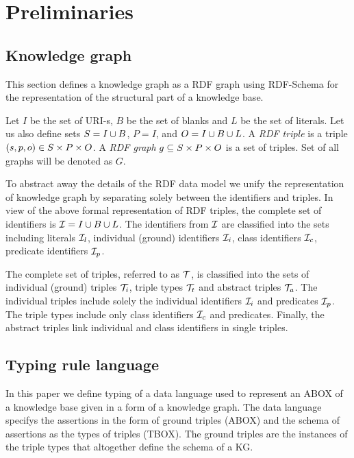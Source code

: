 \documentclass[runningheads]{llncs}
\newcommand{\I}{{\cal I}}
\newcommand{\T}{{\cal T}}
\begin{document}
\section{Preliminaries}


\subsection{Knowledge graph\label{sec:kg}}

This section defines a knowledge graph as a RDF graph \cite{rdf} using
RDF-Schema \cite{rdfschema} for the representation of the structural
part of a knowledge base. 

Let $I$ be the set of URI-s, $B$ be the set of blanks and $L$ be the
set of literals. Let us also define sets $S = I\cup\/B$, $P = I$, and
$O = I\cup\/B\cup\/L$. A \emph{RDF triple} is a triple
$(s,p,o)\in\/S\times\/P\times\/O$. A \emph{RDF graph}
$g\subseteq\/S\times\/P\times\/O$ is a set of triples. Set of all
graphs will be denoted as $G$.


To abstract away the details of the RDF data model we unify the
representation of knowledge graph by separating solely between the
identifiers and triples. In view of the above formal representation of
RDF triples, the complete set of identifiers is
$\I=I\cup\/B\cup\/L$. The identifiers from $\I$ are classified into
the sets including literals $\I_l$, individual (ground) identifiers
$\I_i$, class identifiers $\I_c$, predicate identifiers $\I_p$.

The complete set of triples, referred to as $\T$, is classified into
the sets of individual (ground) triples $\T_i$, triple types $\T_t$
and abstract triples $\T_a$. The individual triples include solely the
individual identifiers $\I_i$ and predicates $\I_p$. The triple types
include only class identifiers $\I_c$ and predicates. Finally, the
abstract triples link individual and class identifiers in single
triples.



\subsection{Typing rule language}

In this paper we define typing of a data language used to represent an
ABOX \cite{Brachman2004KnowledgeRR} of a knowledge base given in a
form of a knowledge graph. The data language specifys the assertions
in the form of ground triples (ABOX) and the schema of assertions as
the types of triples (TBOX). The ground triples are the instances of
the triple types that altogether define the schema of a KG.
\end{document}

